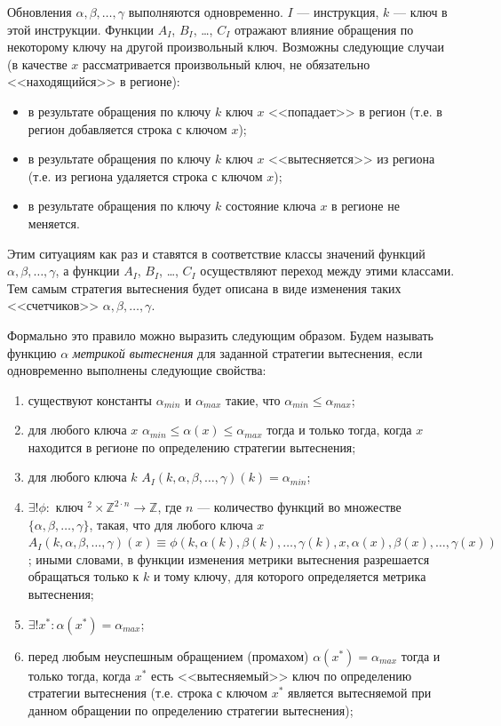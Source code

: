 \documentclass[14pt]{extreport}
\begin{document}
Обновления $\alpha, \beta, \dots, \gamma$ выполняются одновременно. $I$ --- инструкция, $k$ --- ключ в этой инструкции. Функции $A_I$, $B_I$, \dots, $C_I$ отражают влияние обращения по некоторому ключу на другой произвольный ключ. Возможны следующие случаи (в качестве $x$ рассматривается произвольный ключ, не обязательно <<находящийся>> в регионе):
\begin{itemize}
    \item в результате обращения по ключу $k$ ключ $x$ <<попадает>> в регион (т.е. в регион добавляется строка с ключом $x$);
    \item в результате обращения по ключу $k$ ключ $x$ <<вытесняется>> из региона (т.е. из региона удаляется строка с ключом $x$);
    \item в результате обращения по ключу $k$ состояние ключа $x$ в регионе не меняется.
\end{itemize}

Этим ситуациям как раз и ставятся в соответствие классы значений функций $\alpha, \beta, \dots, \gamma$, а функции $A_I$, $B_I$, \dots, $C_I$ осуществляют переход между этими классами. Тем самым стратегия вытеснения будет описана в виде изменения таких <<счетчиков>> $\alpha, \beta, \dots, \gamma$.

Формально это правило можно выразить следующим образом. Будем называть функцию $\alpha$ \emph{метрикой вытеснения} для заданной стратегии вытеснения, если одновременно выполнены следующие свойства:
\begin{enumerate}
  \item существуют константы $\alpha_{min}$ и $\alpha_{max}$ такие, что $\alpha_{min} \leqslant \alpha_{max}$;
  \item для любого ключа $x$ $\alpha_{min} \leqslant \alpha(x) \leqslant \alpha_{max}$ тогда и только тогда, когда $x$ находится в регионе по определению стратегии вытеснения;
  \item для любого ключа $k$ $A_I(k, \alpha,\beta,\dots,\gamma) (k) = \alpha_{min}$;
  \item $\exists! \phi: \mbox{~ключ~}^2 \times \mathds{Z}^{2\cdot n} \rightarrow \mathds{Z}$, где $n$ --- количество функций во множестве $\{\alpha,\beta,\dots,\gamma\}$, такая, что для любого ключа $x$ $A_I(k, \alpha,\beta,\dots,\gamma)(x) \equiv \phi(k, \alpha(k), \beta(k), \dots, \gamma(k), x, \alpha(x), \beta(x), \dots, \gamma(x))$; иными словами, в функции изменения метрики вытеснения разрешается обращаться только к $k$ и тому ключу, для которого определяется метрика вытеснения;
  \item $\exists! x^* : \alpha(x^*) = \alpha_{max}$;
  \item перед любым неуспешным обращением (промахом) $\alpha(x^*) = \alpha_{max}$ тогда и только тогда, когда $x^*$ есть <<вытесняемый>> ключ по определению стратегии вытеснения (т.е. строка с ключом $x^*$ является вытесняемой при данном обращении по определению стратегии вытеснения);
\end{enumerate}
\end{document}
